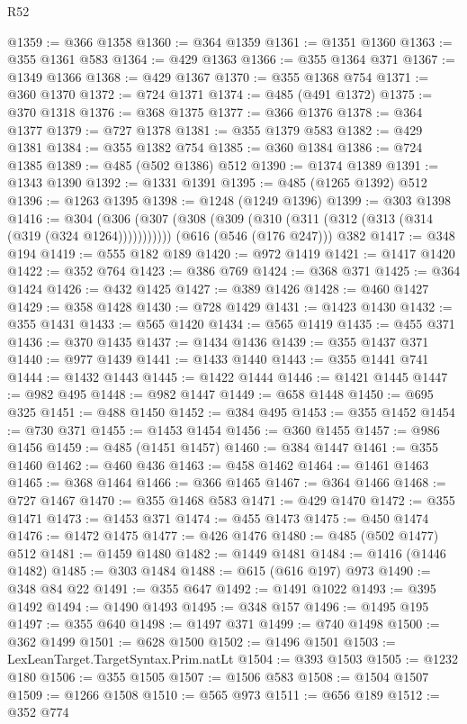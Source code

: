\begin{lexlean}{R52}
\begin{coremodule}
@1359 := @366 @1358
@1360 := @364 @1359
@1361 := @1351 @1360
@1363 := @355 @1361 @583
@1364 := @429 @1363
@1366 := @355 @1364 @371
@1367 := @1349 @1366
@1368 := @429 @1367
@1370 := @355 @1368 @754
@1371 := @360 @1370
@1372 := @724 @1371
@1374 := @485 (@491 @1372)
@1375 := @370 @1318
@1376 := @368 @1375
@1377 := @366 @1376
@1378 := @364 @1377
@1379 := @727 @1378
@1381 := @355 @1379 @583
@1382 := @429 @1381
@1384 := @355 @1382 @754
@1385 := @360 @1384
@1386 := @724 @1385
@1389 := @485 (@502 @1386) @512
@1390 := @1374 @1389
@1391 := @1343 @1390
@1392 := @1331 @1391
@1395 := @485 (@1265 @1392) @512
@1396 := @1263 @1395
@1398 := @1248 (@1249 @1396)
@1399 := @303 @1398
@1416 := @304
    (@306 (@307 (@308 (@309 (@310 (@311 (@312 (@313 (@314 (@319 (@324 @1264)))))))))))
    (@616 (@546 (@176 @247)))
    @382
@1417 := @348 @194
@1419 := @555 @182 @189
@1420 := @972 @1419
@1421 := @1417 @1420
@1422 := @352 @764
@1423 := @386 @769
@1424 := @368 @371
@1425 := @364 @1424
@1426 := @432 @1425
@1427 := @389 @1426
@1428 := @460 @1427
@1429 := @358 @1428
@1430 := @728 @1429
@1431 := @1423 @1430
@1432 := @355 @1431
@1433 := @565 @1420
@1434 := @565 @1419
@1435 := @455 @371
@1436 := @370 @1435
@1437 := @1434 @1436
@1439 := @355 @1437 @371
@1440 := @977 @1439
@1441 := @1433 @1440
@1443 := @355 @1441 @741
@1444 := @1432 @1443
@1445 := @1422 @1444
@1446 := @1421 @1445
@1447 := @982 @495
@1448 := @982 @1447
@1449 := @658 @1448
@1450 := @695 @325
@1451 := @488 @1450
@1452 := @384 @495
@1453 := @355 @1452
@1454 := @730 @371
@1455 := @1453 @1454
@1456 := @360 @1455
@1457 := @986 @1456
@1459 := @485 (@1451 @1457)
@1460 := @384 @1447
@1461 := @355 @1460
@1462 := @460 @436
@1463 := @458 @1462
@1464 := @1461 @1463
@1465 := @368 @1464
@1466 := @366 @1465
@1467 := @364 @1466
@1468 := @727 @1467
@1470 := @355 @1468 @583
@1471 := @429 @1470
@1472 := @355 @1471
@1473 := @1453 @371
@1474 := @455 @1473
@1475 := @450 @1474
@1476 := @1472 @1475
@1477 := @426 @1476
@1480 := @485 (@502 @1477) @512
@1481 := @1459 @1480
@1482 := @1449 @1481
@1484 := @1416 (@1446 @1482)
@1485 := @303 @1484
@1488 := @615 (@616 @197) @973
@1490 := @348 @84 @22
@1491 := @355 @647
@1492 := @1491 @1022
@1493 := @395 @1492
@1494 := @1490 @1493
@1495 := @348 @157
@1496 := @1495 @195
@1497 := @355 @640
@1498 := @1497 @371
@1499 := @740 @1498
@1500 := @362 @1499
@1501 := @628 @1500
@1502 := @1496 @1501
@1503 := LexLeanTarget.TargetSyntax.Prim.natLt
@1504 := @393 @1503
@1505 := @1232 @180
@1506 := @355 @1505
@1507 := @1506 @583
@1508 := @1504 @1507
@1509 := @1266 @1508
@1510 := @565 @973
@1511 := @656 @189
@1512 := @352 @774

\end{coremodule}
\end{lexlean}
